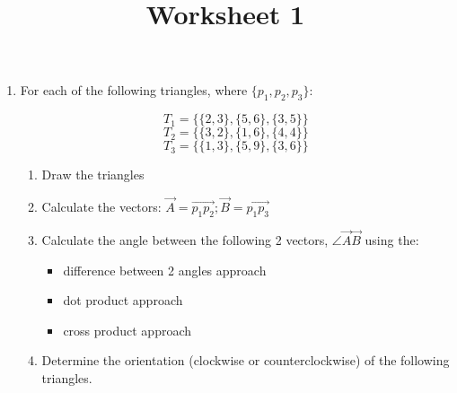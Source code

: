 \documentclass[a4paper,12pt]{article}
\title{Worksheet 1}
\begin{document}
\maketitle

\worksheetGroundRules

\worksheetSubmission

\assignmentInstructions



\begin{enumerate}

\item For each of the following triangles, where $\{p_1,p_2,p_3\}$:

\vspace{-10pt}
$$T_1=\{\{2,3\},\{5,6\},\{3,5\}\}$$
$$T_2=\{\{3,2\},\{1,6\},\{4,4\}\}$$
$$T_3=\{\{1,3\},\{5,9\},\{3,6\}\}$$


\begin{enumerate}
\item Draw the triangles

\item Calculate the vectors: $\overrightarrow{A} = \overrightarrow{p_1p_2}; \overrightarrow{B} = \overrightarrow{p_1p_3}$

\item Calculate the angle between the following 2 vectors, $\angle\overrightarrow{A}\overrightarrow{B}$ using the:

\begin{itemize}
\item difference between 2 angles approach
\item dot product approach
\item cross product approach
\end{itemize}

\item Determine the orientation (clockwise or counterclockwise) of the following triangles.

\end{enumerate}




\end{enumerate}
\end{document}
